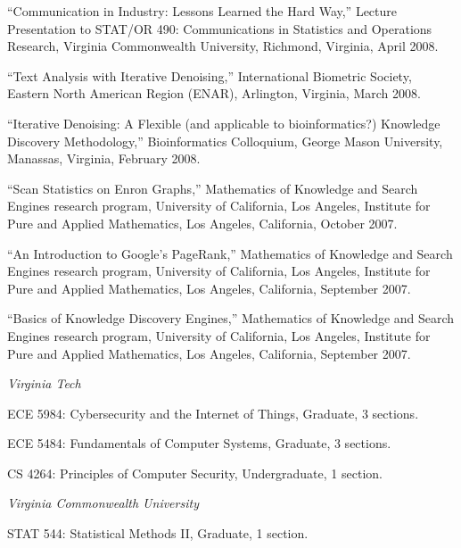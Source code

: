 \documentclass[11pt,article,oneside]{memoir}
\begin{document}
\ind “Communication in Industry: Lessons Learned the Hard Way,” Lecture Presentation to STAT/OR 490: Communications in Statistics and Operations Research, Virginia Commonwealth University, Richmond, Virginia, April 2008.

\ind “Text Analysis with Iterative Denoising,” International Biometric Society, Eastern North American Region (ENAR), Arlington, Virginia, March 2008.

\ind “Iterative Denoising: A Flexible (and applicable to bioinformatics?) Knowledge Discovery Methodology,” Bioinformatics Colloquium, George Mason University, Manassas, Virginia, February 2008.

\ind “Scan Statistics on Enron Graphs,” Mathematics of Knowledge and Search Engines research program, University of California, Los Angeles, Institute for Pure and Applied Mathematics, Los Angeles, California, October 2007.

\ind “An Introduction to Google’s PageRank,” Mathematics of Knowledge and Search Engines research program, University of California, Los Angeles, Institute for Pure and Applied Mathematics, Los Angeles, California, September 2007.

\ind “Basics of Knowledge Discovery Engines,” Mathematics of Knowledge and Search Engines research program, University of California, Los Angeles, Institute for Pure and Applied Mathematics, Los Angeles, California, September 2007.


 


\bigskip


\noindent\emph{Virginia Tech \vspace{0.05in}}

\ind ECE 5984: Cybersecurity and the Internet of Things, Graduate, 3 sections.

\ind ECE 5484: Fundamentals of Computer Systems, Graduate, 3 sections.

\ind CS 4264: Principles of Computer Security, Undergraduate, 1 section.

\newpage

\noindent\emph{Virginia Commonwealth University \vspace{0.05in}}

\ind STAT 544: Statistical Methods II, Graduate, 1 section.
\end{document}
